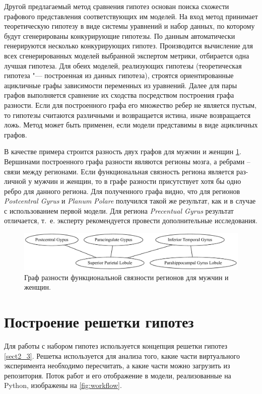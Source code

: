 Другой предлагаемый метод сравнения гипотез основан поиска схожести графового представления соответствующих им моделей. На вход метод принимает теоретическую гипотезу в виде системы уравнений и набор данных, по которому будут сгенерированы конкурирующие гипотезы. По данным автоматически генерируются несколько конкурирующих гипотез. Производится вычисление для всех сгенерированных моделей выбранной экспертом метрики, отбирается одна лучшая гипотеза. Для обеих моделей, реализующих гипотезы (теоретическая гипотеза "--- построенная из данных гипотеза), строятся ориентированные ацикличные графы зависимости переменных из уравнений. Далее для пары графов выполняется сравнение их сходства посредством построения графа разности. Если для построенного графа его множество ребер не является пустым, то гипотезы считаются различными и возвращается истина, иначе возвращается ложь. Метод может быть применен, если модели представимы в виде ацикличных графов.

В качестве примера строится разность двух графов для мужчин и женщин \cref{fig:graph_difference}. Вершинами построенного графа разности являются регионы мозга, а ребрами – связи между регионами. Если функциональная связность региона является раз-личной у мужчин и женщин, то в графе разности присутствует хотя бы одно ребро для данного региона. Для полученного графа видно, что для регионов \textit{Postcentral Gyrus} и \textit{Planum Polare} получился такой же результат, как и в случае с использованием первой модели. Для региона \textit{Precentual Gyrus} результат отличается, т.~е. эксперту рекомендуется провести дополнительные исследования.


\begin{figure}[ht]
    \centering
    \includegraphics[width=1.0\linewidth]{images/graph_difference.pdf}
    \caption{Граф разности функциональной связности регионов для мужчин и женщин.}\label{fig:graph_difference}
\end{figure}

\section{Построение решетки гипотез}\label{sect_5_3}
Для работы с набором гипотез используется концепция решетки гипотез \cref{sect2_3}. Решетка используется для анализа того, какие части виртуального эксперимента необходимо пересчитать, а какие части можно загрузить из репозитория. Поток работ и его отображение в модели, реализованные на Python, изображены на \cref{fig:workflow}.


